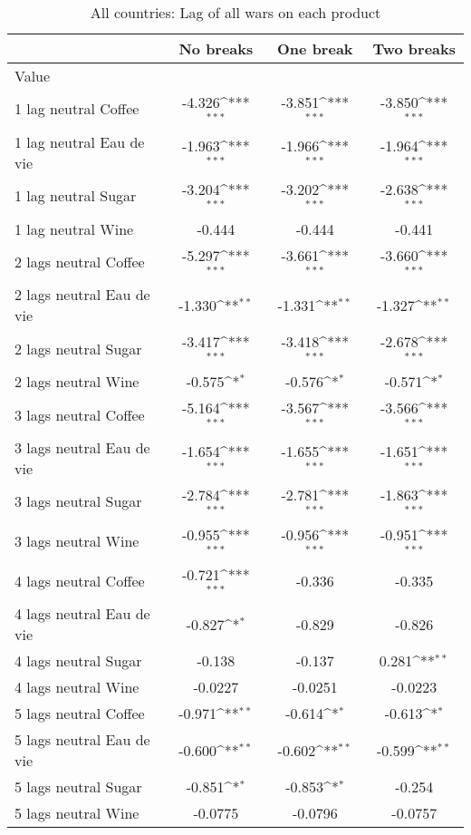 \begin{table}[htbp]\centering
\def\sym#1{\ifmmode^{#1}\else\(^{#1}\)\fi}
\caption{All countries: Lag of all wars on each product\label{tab1}}
\begin{tabular}{l*{3}{c}}
\hline\hline
                    &\multicolumn{1}{c}{No breaks}&\multicolumn{1}{c}{One break}&\multicolumn{1}{c}{Two breaks}\\
\hline
Value               &                     &                     &                     \\
1 lag neutral Coffee&      -4.326\sym{***}&      -3.851\sym{***}&      -3.850\sym{***}\\
1 lag neutral Eau de vie&      -1.963\sym{***}&      -1.966\sym{***}&      -1.964\sym{***}\\
1 lag neutral Sugar &      -3.204\sym{***}&      -3.202\sym{***}&      -2.638\sym{***}\\
1 lag neutral Wine  &      -0.444         &      -0.444         &      -0.441         \\
2 lags neutral Coffee&      -5.297\sym{***}&      -3.661\sym{***}&      -3.660\sym{***}\\
2 lags neutral Eau de vie&      -1.330\sym{**} &      -1.331\sym{**} &      -1.327\sym{**} \\
2 lags neutral Sugar&      -3.417\sym{***}&      -3.418\sym{***}&      -2.678\sym{***}\\
2 lags neutral Wine &      -0.575\sym{*}  &      -0.576\sym{*}  &      -0.571\sym{*}  \\
3 lags neutral Coffee&      -5.164\sym{***}&      -3.567\sym{***}&      -3.566\sym{***}\\
3 lags neutral Eau de vie&      -1.654\sym{***}&      -1.655\sym{***}&      -1.651\sym{***}\\
3 lags neutral Sugar&      -2.784\sym{***}&      -2.781\sym{***}&      -1.863\sym{***}\\
3 lags neutral Wine &      -0.955\sym{***}&      -0.956\sym{***}&      -0.951\sym{***}\\
4 lags neutral Coffee&      -0.721\sym{***}&      -0.336         &      -0.335         \\
4 lags neutral Eau de vie&      -0.827\sym{*}  &      -0.829         &      -0.826         \\
4 lags neutral Sugar&      -0.138         &      -0.137         &       0.281\sym{**} \\
4 lags neutral Wine &     -0.0227         &     -0.0251         &     -0.0223         \\
5 lags neutral Coffee&      -0.971\sym{**} &      -0.614\sym{*}  &      -0.613\sym{*}  \\
5 lags neutral Eau de vie&      -0.600\sym{**} &      -0.602\sym{**} &      -0.599\sym{**} \\
5 lags neutral Sugar&      -0.851\sym{*}  &      -0.853\sym{*}  &      -0.254         \\
5 lags neutral Wine &     -0.0775         &     -0.0796         &     -0.0757         \\


\end{tabular}
\end{table}
